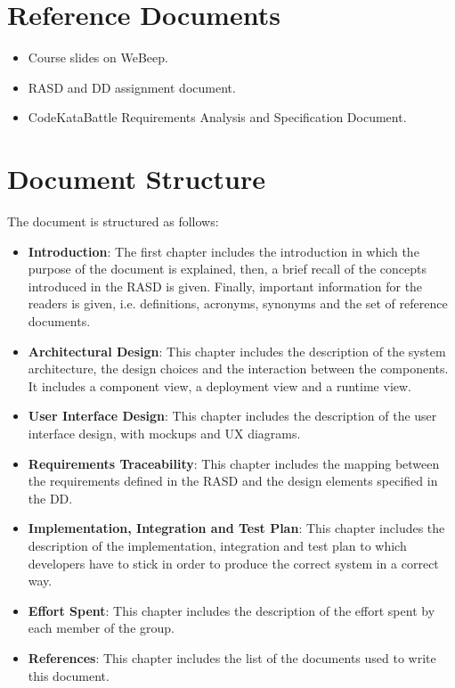 \section{Reference Documents}
\begin{itemize}
    \item Course slides on WeBeep. 
    \item RASD and DD assignment document.
    \item CodeKataBattle Requirements Analysis and Specification Document.
\end{itemize}

\section{Document Structure}
The document is structured as follows:
\begin{itemize}
    \item \textbf{Introduction}: The first chapter includes the introduction in which the purpose of the document is explained, then, a brief recall of the concepts introduced in the RASD is given.
    Finally, important information for the readers is given, i.e. definitions, acronyms, synonyms and the set of reference documents.
    \item \textbf{Architectural Design}: This chapter includes the description of the system architecture, the design choices and the interaction between the components. It includes a component view, a deployment view and a runtime view.
    \item \textbf{User Interface Design}: This chapter includes the description of the user interface design, with mockups and UX diagrams.
    \item \textbf{Requirements Traceability}: This chapter includes the mapping between the requirements defined in the RASD and the design elements specified in the DD.
    \item \textbf{Implementation, Integration and Test Plan}: This chapter includes the description of the implementation, integration and test plan to which developers have to stick in order to produce the correct system in a correct way.
    \item \textbf{Effort Spent}: This chapter includes the description of the effort spent by each member of the group.
    \item \textbf{References}: This chapter includes the list of the documents used to write this document.
\end{itemize}